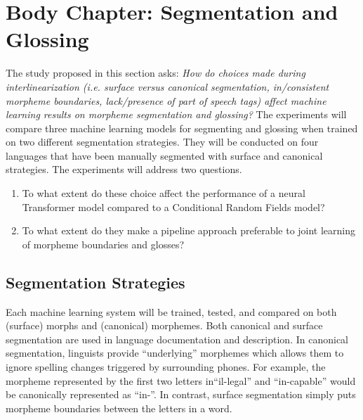 \section{Body Chapter: Segmentation and Glossing}
\label{sec:seggls}

The study proposed in this section asks: \emph{How do choices made during interlinearization (i.e. surface versus canonical segmentation, in/consistent morpheme boundaries, lack/presence of part of speech tags) affect machine learning results on morpheme segmentation and glossing?} The experiments will compare three machine learning models for segmenting and glossing when trained on two different segmentation strategies. They will be conducted on four languages that have been manually segmented with surface and canonical strategies. 
The experiments will address two questions.

\begin{enumerate}
    \item To what extent do these choice affect the performance of a neural Transformer model compared to a Conditional Random Fields model? 
    \item To what extent do they make a pipeline approach preferable to joint learning of morpheme boundaries and glosses?
\end{enumerate}
    
\subsection{Segmentation Strategies}    
Each machine learning system will be trained, tested, and compared on both (surface) morphs and (canonical) morphemes. Both canonical and surface segmentation are used in language documentation and description. In canonical segmentation, linguists provide ``underlying'' morphemes which allows them to ignore spelling changes triggered by surrounding phones. For example, the morpheme represented by the first two letters in``il-legal'' and ``in-capable'' would be canonically represented as ``in-''. In contrast, surface segmentation simply puts morpheme boundaries between the letters in a word. 

